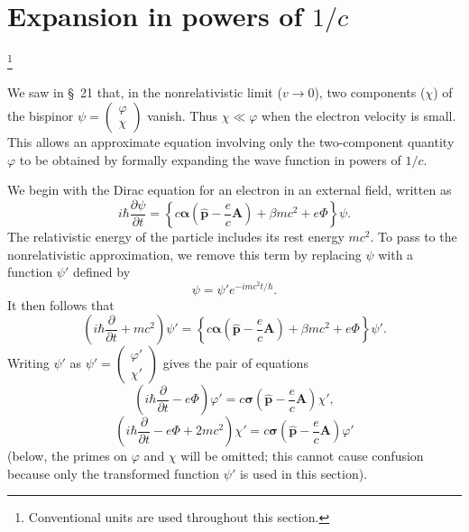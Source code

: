 
\section{Expansion in powers of \texorpdfstring{$1/c$}{1/c}}\footnote{Conventional units are used throughout this section.}

We saw in \S~21 that, in the nonrelativistic limit ($v\to0$), two components ($\chi$) of the bispinor
$\psi=\begin{pmatrix}\varphi\\ \chi\end{pmatrix}$ vanish. Thus $\chi\ll\varphi$ when the electron velocity is small. This allows an approximate equation involving only the two-component quantity $\varphi$ to be obtained by formally expanding the wave function in powers of $1/c$.

We begin with the Dirac equation for an electron in an external field, written as
\begin{equation}
i\hbar\frac{\partial\psi}{\partial t}
=\left\{c\boldsymbol{\alpha}\left(\widehat{\mathbf p}-\frac ec\mathbf A\right)
+\beta mc^2+e\Phi\right\}\psi.
\tag{33.1}
\end{equation}
The relativistic energy of the particle includes its rest energy $mc^2$. To pass to the nonrelativistic approximation, we remove this term by replacing $\psi$ with a function $\psi'$ defined by
\[
\psi=\psi'e^{-imc^2t/\hbar}.
\]
It then follows that
\[
\left(i\hbar\frac{\partial}{\partial t}+mc^2\right)\psi'
=\left\{c\boldsymbol{\alpha}\left(\widehat{\mathbf p}-\frac ec\mathbf A\right)
+\beta mc^2+e\Phi\right\}\psi'.
\]
Writing $\psi'$ as
$\psi'=\begin{pmatrix}\varphi'\\ \chi'\end{pmatrix}$ gives the pair of equations
\begin{equation}
\left(i\hbar\frac{\partial}{\partial t}-e\Phi\right)\varphi'
=c\boldsymbol{\sigma}\left(\widehat{\mathbf p}-\frac ec\mathbf A\right)\chi',
\tag{33.2}
\end{equation}
\begin{equation}
\left(i\hbar\frac{\partial}{\partial t}-e\Phi+2mc^2\right)\chi'
=c\boldsymbol{\sigma}\left(\widehat{\mathbf p}-\frac ec\mathbf A\right)\varphi'
\tag{33.3}
\end{equation}
(below, the primes on $\varphi$ and $\chi$ will be omitted; this cannot cause confusion because only the transformed function $\psi'$ is used in this section).

